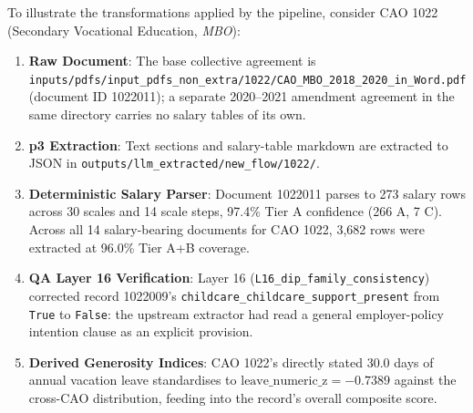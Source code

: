 To illustrate the transformations applied by the pipeline, consider CAO 1022 (Secondary Vocational Education, \emph{MBO}):
\begin{enumerate}[noitemsep,topsep=2pt,leftmargin=1.5em]
  \item \textbf{Raw Document}: The base collective agreement is \nolinkurl{inputs/pdfs/input_pdfs_non_extra/1022/CAO_MBO_2018_2020_in_Word.pdf} (document ID 1022011); a separate 2020--2021 amendment agreement in the same directory carries no salary tables of its own.
  \item \textbf{p3 Extraction}: Text sections and salary-table markdown are extracted to JSON in \nolinkurl{outputs/llm_extracted/new_flow/1022/}.
  \item \textbf{Deterministic Salary Parser}: Document 1022011 parses to 273 salary rows across 30 scales and 14 scale steps, 97.4\% Tier A confidence (266 A, 7 C). Across all 14 salary-bearing documents for CAO 1022, 3,682 rows were extracted at 96.0\% Tier A+B coverage.
  \item \textbf{QA Layer 16 Verification}: Layer 16 (\nolinkurl{L16_dip_family_consistency}) corrected record 1022009's \nolinkurl{childcare_childcare_support_present} from \texttt{True} to \texttt{False}: the upstream extractor had read a general employer-policy intention clause as an explicit provision.
  \item \textbf{Derived Generosity Indices}: CAO 1022's directly stated 30.0 days of annual vacation leave standardises to $\text{leave\_numeric\_z} = -0.7389$ against the cross-CAO distribution, feeding into the record's overall composite score.
\end{enumerate}
